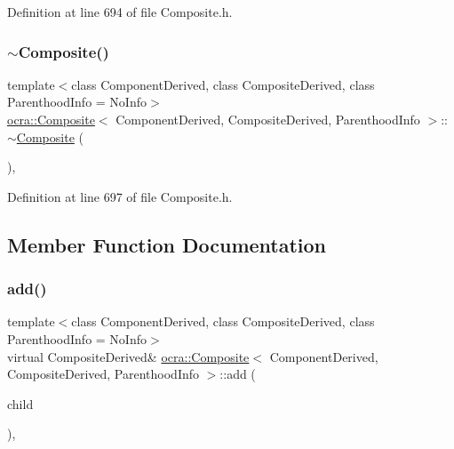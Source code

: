 Definition at line 694 of file Composite.\+h.

\hypertarget{classocra_1_1Composite_add2839972d0072ced63b5a3a71fbf065}{}\label{classocra_1_1Composite_add2839972d0072ced63b5a3a71fbf065} 
\subsubsection{\texorpdfstring{$\sim$\+Composite()}{~Composite()}}
{\footnotesize\ttfamily template$<$class Component\+Derived, class Composite\+Derived, class Parenthood\+Info = No\+Info$>$ \\
\hyperlink{classocra_1_1Composite}{ocra\+::\+Composite}$<$ Component\+Derived, Composite\+Derived, Parenthood\+Info $>$\+::$\sim$\hyperlink{classocra_1_1Composite}{Composite} (\begin{DoxyParamCaption}{ }\end{DoxyParamCaption})\hspace{0.3cm}{\ttfamily [inline]}, {\ttfamily [protected]}}



Definition at line 697 of file Composite.\+h.



\subsection{Member Function Documentation}
\hypertarget{classocra_1_1Composite_a6751fd4b421edc193c10c858b5f00a34}{}\label{classocra_1_1Composite_a6751fd4b421edc193c10c858b5f00a34} 
\subsubsection{\texorpdfstring{add()}{add()}}
{\footnotesize\ttfamily template$<$class Component\+Derived, class Composite\+Derived, class Parenthood\+Info = No\+Info$>$ \\
virtual Composite\+Derived\& \hyperlink{classocra_1_1Composite}{ocra\+::\+Composite}$<$ Component\+Derived, Composite\+Derived, Parenthood\+Info $>$\+::add (\begin{DoxyParamCaption}\item[{Component\+Derived \&}]{child }\end{DoxyParamCaption})\hspace{0.3cm}{\ttfamily [inline]}, {\ttfamily [virtual]}}



